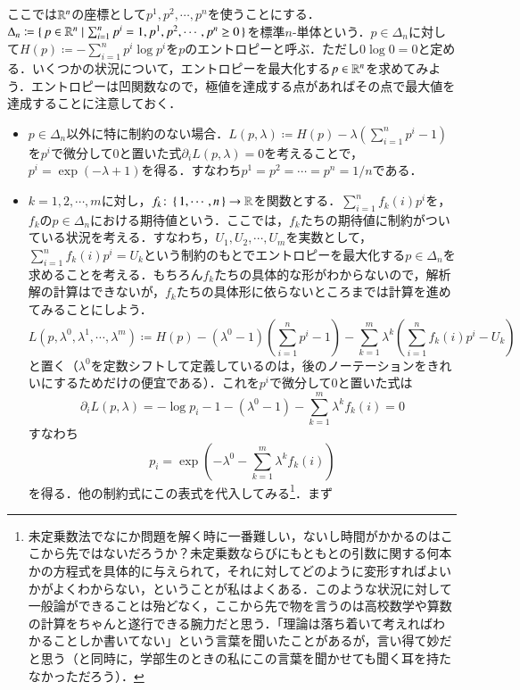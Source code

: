\begin{exm}
ここでは$\mathbb{R}^n$の座標として$p^1, p^2, \cdots, p^n$を使うことにする．$\Delta_n \coloneqq \set{ p \in \mathbb{R}^n | \sum_{i=1}^n p^i = 1, p^1, p^2, \cdots, p^n \geq 0 }$を標準$n$-単体という．$p \in \Delta_n$に対して$H(p) \coloneqq -\sum_{i=1}^n p^i \log p^i$を$p$のエントロピーと呼ぶ．ただし$0 \log 0=0$と定める．いくつかの状況について，エントロピーを最大化する$p \in \mathbb{R}^n$を求めてみよう．エントロピーは凹関数なので，極値を達成する点があればその点で最大値を達成することに注意しておく．
\begin{itemize}
\item $p \in \Delta_n$以外に特に制約のない場合．$L(p,\lambda) \coloneqq H(p) - \lambda (\sum_{i=1}^n p^i - 1)$を$p^i$で微分して0と置いた式$\partial_i L(p,\lambda)=0$を考えることで，$p^i = \exp(-\lambda+1)$を得る．すなわち$p^1 = p^2 = \cdots =p^n = 1/n$である．
\item $k=1,2,\cdots,m$に対し，$f_k \colon \set{1,\cdots,n} \to \mathbb{R}$を関数とする．$\sum_{i=1}^n f_k(i) p^i$を，$f_k$の$p \in \Delta_n$における期待値という．ここでは，$f_k$たちの期待値に制約がついている状況を考える．すなわち，$U_1, U_2, \cdots, U_m$を実数として，$\sum_{i=1}^n f_k(i) p^i = U_k$という制約のもとでエントロピーを最大化する$p \in \Delta_n$を求めることを考える．もちろん$f_k$たちの具体的な形がわからないので，解析解の計算はできないが，$f_k$たちの具体形に依らないところまでは計算を進めてみることにしよう．
\begin{equation}
L(p, \lambda^0, \lambda^1, \cdots, \lambda^m) \coloneqq H(p) - (\lambda^0-1) \left(\sum_{i=1}^n p^i - 1\right) - \sum_{k=1}^m \lambda^k \left(\sum_{i=1}^n f_k(i) p^i - U_k\right)
\end{equation}と置く（$\lambda^0$を定数シフトして定義しているのは，後のノーテーションをきれいにするためだけの便宜である）．これを$p^i$で微分して0と置いた式は
\begin{equation}
\partial_i L(p,\lambda) = -\log p_i - 1 - (\lambda^0 - 1) - \sum_{k=1}^m \lambda^k f_k(i) =0
\end{equation}すなわち
\begin{equation}
p_i = \exp\left(- \lambda^0 - \sum_{k=1}^m \lambda^k f_k(i) \right)
\end{equation}を得る．他の制約式にこの表式を代入してみる\footnote{未定乗数法でなにか問題を解く時に一番難しい，ないし時間がかかるのはここから先ではないだろうか？未定乗数ならびにもともとの引数に関する何本かの方程式を具体的に与えられて，それに対してどのように変形すればよいかがよくわからない，ということが私はよくある．このような状況に対して一般論ができることは殆どなく，ここから先で物を言うのは高校数学や算数の計算をちゃんと遂行できる腕力だと思う．「理論は落ち着いて考えればわかることしか書いてない」という言葉を聞いたことがあるが，言い得て妙だと思う（と同時に，学部生のときの私にこの言葉を聞かせても聞く耳を持たなかっただろう）．}．まず

\end{itemize}
\end{exm}
